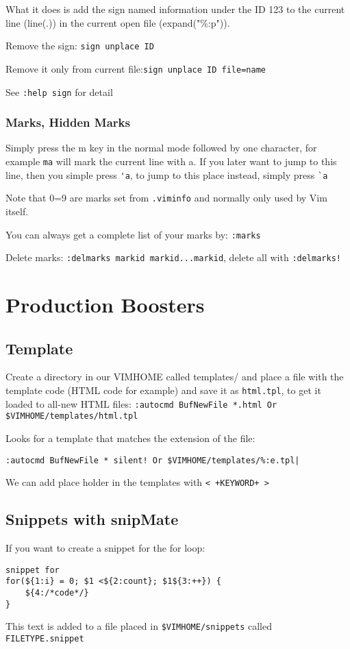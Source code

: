 \documentclass[11pt]{book}
\begin{document}
What it does is add the sign named information under the ID 123 to the current
line (line(.)) in the current open file (expand("\%:p")).

Remove the sign: \verb|sign unplace ID|

Remove it only from current file:\verb|sign unplace ID file=name|

See \verb|:help sign| for detail

\subsection{Marks, Hidden Marks}
Simply press the m key in the normal mode followed by one character, for example
\verb|ma| will mark the current line with a. If you
later want to jump to this line, then you simple press \verb|'a|, to jump to
this place instead, simply press \verb|`a|

Note that 0=9 are marks set from \verb|.viminfo| and normally only used by Vim
itself.

You can always get a complete list of your marks by: \verb|:marks|

Delete marks: \verb|:delmarks markid markid...markid|, delete all with
\verb|:delmarks!|
\chapter{Production Boosters}
\section{Template}
Create a directory in our VIMHOME called templates/ and place a file with the
template code (HTML code for example) and save it as \verb|html.tpl|, to get it
loaded to all-new HTML files:
\verb|:autocmd BufNewFile *.html Or $VIMHOME/templates/html.tpl|

Looks for a template that matches the extension of the file:
\begin{verbatim}
:autocmd BufNewFile * silent! Or $VIMHOME/templates/%:e.tpl|
\end{verbatim}
We can add place holder in the templates with \verb|< +KEYWORD+ >|

\section{Snippets with snipMate}
If you want to create a snippet for the for loop:
\begin{verbatim}
snippet for
for(${1:i} = 0; $1 <${2:count}; $1${3:++}) {
    ${4:/*code*/}
}
\end{verbatim}
This text is added to a file placed in \verb|$VIMHOME/snippets| called
\verb|FILETYPE.snippet|
\end{document}
